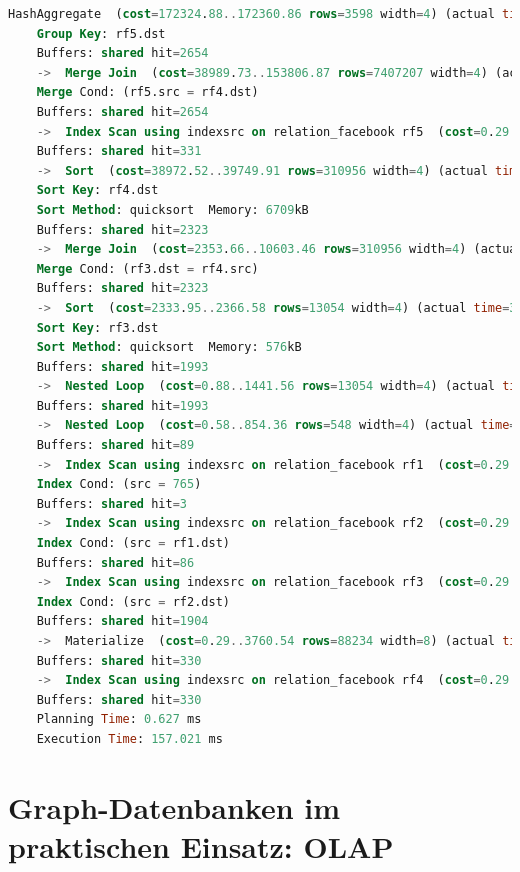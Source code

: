 \begin{lstlisting}[language=SQL,caption = Ausführungsplan INNER JOIN,frame=single, label={AusführungsplanINNERJOIN} ]
    HashAggregate  (cost=172324.88..172360.86 rows=3598 width=4) (actual time=156.786..156.823 rows=317 loops=1)
    Group Key: rf5.dst
    Buffers: shared hit=2654
    ->  Merge Join  (cost=38989.73..153806.87 rows=7407207 width=4) (actual time=33.728..105.213 rows=572149 loops=1)
    Merge Cond: (rf5.src = rf4.dst)
    Buffers: shared hit=2654
    ->  Index Scan using indexsrc on relation_facebook rf5  (cost=0.29..3539.96 rows=88234 width=8) (actual time=0.004..3.466 rows=33654 loops=1)
    Buffers: shared hit=331
    ->  Sort  (cost=38972.52..39749.91 rows=310956 width=4) (actual time=30.171..50.861 rows=579169 loops=1)
    Sort Key: rf4.dst
    Sort Method: quicksort  Memory: 6709kB
    Buffers: shared hit=2323
    ->  Merge Join  (cost=2353.66..10603.46 rows=310956 width=4) (actual time=9.093..21.946 rows=77587 loops=1)
    Merge Cond: (rf3.dst = rf4.src)
    Buffers: shared hit=2323
    ->  Sort  (cost=2333.95..2366.58 rows=13054 width=4) (actual time=3.176..3.593 rows=8177 loops=1)
    Sort Key: rf3.dst
    Sort Method: quicksort  Memory: 576kB
    Buffers: shared hit=1993
    ->  Nested Loop  (cost=0.88..1441.56 rows=13054 width=4) (actual time=0.012..2.289 rows=8177 loops=1)
    Buffers: shared hit=1993
    ->  Nested Loop  (cost=0.58..854.36 rows=548 width=4) (actual time=0.009..0.156 rows=629 loops=1)
    Buffers: shared hit=89
    ->  Index Scan using indexsrc on relation_facebook rf1  (cost=0.29..44.00 rows=23 width=4) (actual time=0.004..0.008 rows=27 loops=1)
    Index Cond: (src = 765)
    Buffers: shared hit=3
    ->  Index Scan using indexsrc on relation_facebook rf2  (cost=0.29..34.96 rows=27 width=8) (actual time=0.001..0.003 rows=23 loops=27)
    Index Cond: (src = rf1.dst)
    Buffers: shared hit=86
    ->  Index Scan using indexsrc on relation_facebook rf3  (cost=0.29..0.80 rows=27 width=8) (actual time=0.001..0.002 rows=13 loops=629)
    Index Cond: (src = rf2.dst)
    Buffers: shared hit=1904
    ->  Materialize  (cost=0.29..3760.54 rows=88234 width=8) (actual time=0.004..8.301 rows=109531 loops=1)
    Buffers: shared hit=330
    ->  Index Scan using indexsrc on relation_facebook rf4  (cost=0.29..3539.96 rows=88234 width=8) (actual time=0.003..3.863 rows=33653 loops=1)
    Buffers: shared hit=330
    Planning Time: 0.627 ms
    Execution Time: 157.021 ms

\end{lstlisting}

\section{Graph-Datenbanken im praktischen Einsatz: OLAP}

